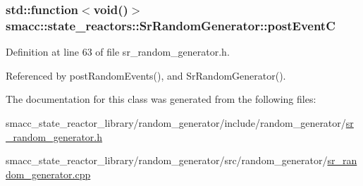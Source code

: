 \subsubsection[{\texorpdfstring{post\+EventC}{postEventC}}]{\setlength{\rightskip}{0pt plus 5cm}std\+::function$<$void()$>$ smacc\+::state\+\_\+reactors\+::\+Sr\+Random\+Generator\+::post\+EventC\hspace{0.3cm}{\ttfamily [private]}}\hypertarget{classsmacc_1_1state__reactors_1_1SrRandomGenerator_a1aeb07de7b52a9f5811e5f60444731a0}{}\label{classsmacc_1_1state__reactors_1_1SrRandomGenerator_a1aeb07de7b52a9f5811e5f60444731a0}


Definition at line 63 of file sr\+\_\+random\+\_\+generator.\+h.



Referenced by post\+Random\+Events(), and Sr\+Random\+Generator().



The documentation for this class was generated from the following files\+:\begin{DoxyCompactItemize}
\item 
smacc\+\_\+state\+\_\+reactor\+\_\+library/random\+\_\+generator/include/random\+\_\+generator/\hyperlink{sr__random__generator_8h}{sr\+\_\+random\+\_\+generator.\+h}\item 
smacc\+\_\+state\+\_\+reactor\+\_\+library/random\+\_\+generator/src/random\+\_\+generator/\hyperlink{sr__random__generator_8cpp}{sr\+\_\+random\+\_\+generator.\+cpp}\end{DoxyCompactItemize}
